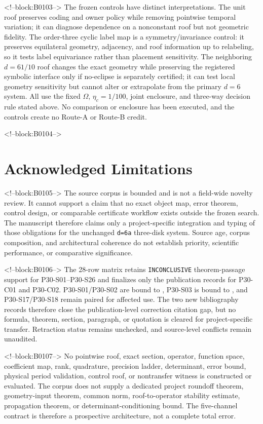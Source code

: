 \documentclass[11pt,a4paper]{article}
\begin{document}
<!--block:B0103-->
The frozen controls have distinct interpretations.  The unit roof preserves
coding and owner policy while removing pointwise temporal variation; it can
diagnose dependence on a nonconstant roof but not geometric fidelity.  The
order-three cyclic label map is a symmetry/invariance control: it preserves
equilateral geometry, adjacency, and roof information up to relabeling, so it
tests label equivariance rather than placement sensitivity.  The neighboring
\(d=61/10\) roof changes the exact geometry while preserving the registered
symbolic interface only if no-eclipse is separately certified; it can test local
geometry sensitivity but cannot alter or extrapolate from the primary \(d=6\)
system.  All use the fixed \(\Omega\), \(\eta_c=1/100\), joint enclosure, and
three-way decision rule stated above.  No comparison or enclosure has been
executed, and the controls create no Route-A or Route-B credit.

<!--block:B0104-->
\section{Acknowledged Limitations}

<!--block:B0105-->
The source corpus is bounded and is not a field-wide novelty review. It cannot support a claim that no exact object map, error theorem, control design, or comparable certificate workflow exists outside the frozen search. The manuscript therefore claims only a project-specific integration and typing of those obligations for the unchanged \texttt{d=6a} three-disk system. Source age, corpus composition, and architectural coherence do not establish priority, scientific performance, or comparative significance.

<!--block:B0106-->
The 28-row matrix retains \texttt{INCONCLUSIVE} theorem-passage support for
P30-S01--P30-S26 and finalizes only the publication records for P30-C01 and
P30-C02.  P30-S01/P30-S02 are bound to \citep{P30-C01}, P30-S03 is bound to
\citep{P30-C02}, and P30-S17/P30-S18 remain paired for affected use.  The two
new bibliography records therefore close the publication-level correction
citation gap, but no formula, theorem, section, paragraph, or quotation is
cleared for project-specific transfer.  Retraction status remains unchecked,
and source-level conflicts remain unaudited.

<!--block:B0107-->
No pointwise roof, exact section, operator, function space, coefficient map, rank, quadrature, precision ladder, determinant, error bound, physical period validation, control roof, or nontransfer witness is constructed or evaluated. The corpus does not supply a dedicated project roundoff theorem, geometry-input theorem, common norm, roof-to-operator stability estimate, propagation theorem, or determinant-conditioning bound. The five-channel contract is therefore a prospective architecture, not a complete total error.
\end{document}
